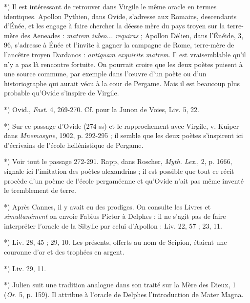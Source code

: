 \documentclass[a4paper, 11pt, oneside, polutonikogreek, french]{article}
\begin{document}
*) Il est intéressant de retrouver dans Virgile le même oracle en termes identiques. Apollon Pythien, dans Ovide, s'adresse aux Romains, descendants d'Énée, et les engage à faire chercher la déesse mère du pays troyen sur la terre-mère des Aeneades : \emph{matrem iubeo... requiras} ; Apollon Délien, dans l'Énéide, 3, 96, s'adresse à Énée et l'invite à gagner la campagne de Rome, terre-mère de l'ancêtre troyen Dardanos : \emph{antiquam exquirite matrem}. Il est vraisemblable qu'il n'y a pas là rencontre fortuite. On pourrait croire que les deux poètes puisent à une source commune, par exemple dans l'œuvre d'un poète ou d'un historiographe qui aurait vécu à la cour de Pergame. Mais il est beaucoup plus probable qu'Ovide s'inspire de Virgile.

*) Ovid., \emph{Fast.} 4, 269-270. Cf. pour la Junon de Voies, Liv. 5, 22.

*) Sur ce passage d'Ovide (274 ss) et le rapprochement avec Virgile, v. Kuiper dans \emph{Mnemosyne}, 1902, p. 292-295 ; il semble que les deux poètes s'inspirent ici d'écrivains de l'école hellénistique de Pergame.

*) Voir tout le passage 272-291. Rapp, dans Roscher, \emph{Myth. Lex.}, 2, p. 1666, signale ici l'imitation des poètes alexandrins ; il est possible que tout ce récit procède d'un poème de l'école pergaméenne et qu'Ovide n'ait pas même inventé le tremblement de terre.

*) Après Cannes, il y avait eu des prodiges. On consulte les Livres et \emph{simultanément} on envoie Fabius Pictor à Delphes ; il ne s'agit pas de faire interpréter l'oracle de la Sibylle par celui d'Apollon : Liv. 22, 57 ; 23, 11.

*) Liv. 28, 45 ; 29, 10. Les présents, offerts au nom de Scipion, étaient une couronne d'or et des trophées en argent.

*) Liv. 29, 11.

*) Julien suit une tradition analogue dans son traité sur la Mère des Dieux, 1 (\emph{Or.} 5, p. 159). Il attribue à l'oracle de Delphes l'introduction de Mater Magna.
\end{document}
